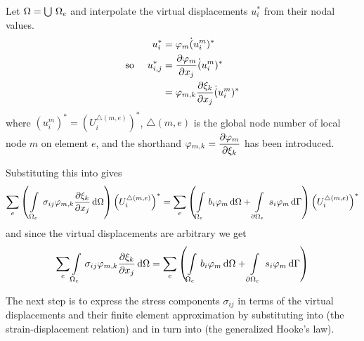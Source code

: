 Let $\Omega = \bigcup\thinspace\Omega_{e}$ and interpolate the virtual
displacements $u_{i}^{*}$ from their nodal values. \ie
\begin{gather}
  \begin{aligned}
    u_{i}^{*} &=  \varphi_{m}  \dot (u_{i}^{m})^{*} \\
    \text{so }\quad u_{i,j}^{*} &=  \dfrac{\partial  \varphi_{m} }{\partial x_{j}}  \dot (u_{i}^{m})^{*} \\
    &=  \varphi_{m,k}   \dfrac{\partial \xi_{k}}{\partial x_{j}}  \dot (u_{i}^{m})^{*}    
  \end{aligned}
  \label{eqn:virtdisplapprox}
\end{gather}
where $(u_{i}^{m})^{*} = (U_{i}^{\triangle(m,e)})^{*}$, $\triangle(m,e)$ is
the global node number of local node $m$ on element $e$, and the shorthand
$ \varphi_{m,k} = \dfrac{\partial  \varphi_{m} }{\partial \xi_{k}} $ has been introduced.

Substituting this into  gives
\begin{equation*}
  \sum_{e} \pbrac{
    \gint{\thickspace\Omega_{e}}{}{\sigma_{ij}\lbfnsymb{m,k}\delby{\xi_{k}}{x_{j}}}
    {\Omega} } \pbrac{ U_{i}^{\triangle(m,e)} }^{*} = \sum_{e} \pbrac{
    \gint{\Omega_{e}}{}{b_{i}\lbfnsymb{m}}{\Omega} + \gint{\del
    \Omega_{e}}{}{s_{i}\lbfnsymb{m}}{\Gamma} } \pbrac{U_{i}^{\triangle(m,e)}
    }^{*}
\end{equation*}
and since the virtual displacements are arbitrary we get
\begin{equation}
  \sum_{e}\gint{\Omega_{e}}{}{\sigma_{ij}\lbfnsymb{m,k}\delby{\xi_{k}}{x_{j}}}{\Omega}
    = \sum_{e} \pbrac{\gint{\Omega_{e}}{}{b_{i}\lbfnsymb{m}}{\Omega} 
    + \gint{\del \Omega_{e}}{}{s_{i}\lbfnsymb{m}}{\Gamma}}
  \label{eqn:intequilib}
\end{equation}

The next step is to express the stress components $\sigma_{ij}$ in terms of
the virtual displacements and their finite element approximation by
substituting  into  (the
strain-displacement relation) and in turn into  (the
generalized Hooke's law).

